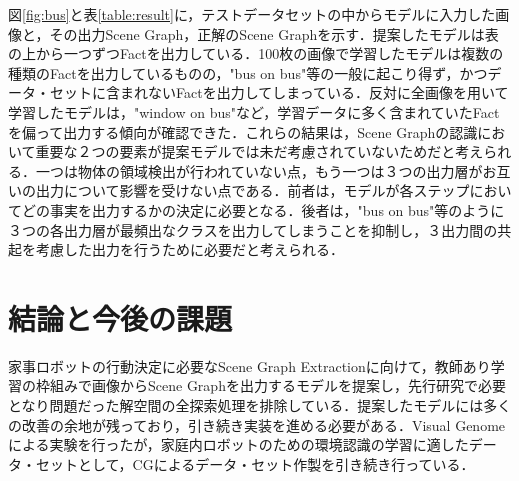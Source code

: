 図\ref{fig:bus}と表\ref{table:result}に，テストデータセットの中からモデルに入力した画像と，その出力Scene Graph，正解のScene Graphを示す．提案したモデルは表の上から一つずつFactを出力している．100枚の画像で学習したモデルは複数の種類のFactを出力しているものの，"bus on bus"等の一般に起こり得ず，かつデータ・セットに含まれないFactを出力してしまっている．反対に全画像を用いて学習したモデルは，"window on bus"など，学習データに多く含まれていたFactを偏って出力する傾向が確認できた．これらの結果は，Scene Graphの認識において重要な２つの要素が提案モデルでは未だ考慮されていないためだと考えられる．一つは物体の領域検出が行われていない点，もう一つは３つの出力層がお互いの出力について影響を受けない点である．前者は，モデルが各ステップにおいてどの事実を出力するかの決定に必要となる．後者は，"bus on bus"等のように３つの各出力層が最頻出なクラスを出力してしまうことを抑制し，３出力間の共起を考慮した出力を行うために必要だと考えられる．
\section{結論と今後の課題}
家事ロボットの行動決定に必要なScene Graph Extractionに向けて，教師あり学習の枠組みで画像からScene Graphを出力するモデルを提案し，先行研究で必要となり問題だった解空間の全探索処理を排除している．提案したモデルには多くの改善の余地が残っており，引き続き実装を進める必要がある．Visual Genomeによる実験を行ったが，家庭内ロボットのための環境認識の学習に適したデータ・セットとして，CGによるデータ・セット作製を引き続き行っている．



